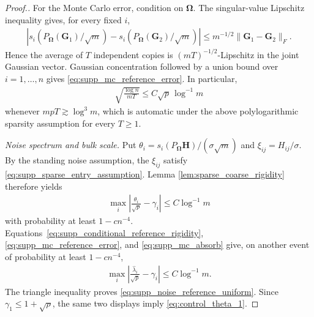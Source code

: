 \documentclass[numsec,webpdf,modern,large,namedate]{oup-authoring-template}
\theoremstyle{plain}
\theoremstyle{remark}
\newcommand{\bH}{\bm{H}}
\newcommand{\bOmega}{\bm{\Omega}}
\newif\ifmarkchanges
\newenvironment{revision}{\begingroup\ifmarkchanges\color{red}\fi}{\endgroup}
\begin{document}
\begin{revision}
\begin{proof}[Proof.]
For the Monte Carlo error, condition on $\bOmega$.  The singular-value
Lipschitz inequality gives, for every fixed $i$,
\begin{align*}
    |s_i(P_{\bOmega}(\bm G_1)/\sqrt m)
      -s_i(P_{\bOmega}(\bm G_2)/\sqrt m)|
    \le m^{-1/2}\|\bm G_1-\bm G_2\|_F.
\end{align*}
Hence the average of $T$ independent copies is
$(mT)^{-1/2}$-Lipschitz in the joint Gaussian vector.  Gaussian
concentration followed by a union bound over $i=1,\ldots,n$ gives
\eqref{eq:supp_mc_reference_error}.  In particular,
\begin{align}
\label{eq:supp_mc_absorb}
    \sqrt{\frac{\log n}{mT}}
    \le C\sqrt p\,\log^{-1}m
\end{align}
whenever $mpT\gtrsim\log^3m$, which is automatic under the above
polylogarithmic sparsity assumption for every $T\ge1$.

\textit{Noise spectrum and bulk scale.} Put
$\theta_i=s_i(P_{\bOmega}\bH)/(\sigma\sqrt m)$ and $\xi_{ij}=H_{ij}/\sigma$.  By the standing noise assumption, the $\xi_{ij}$ satisfy
\eqref{eq:supp_sparse_entry_assumption}.  Lemma
\ref{lem:sparse_coarse_rigidity} therefore yields
\begin{align}
\label{eq:supp_noise_to_mp}
    \max_i\left|
    \frac{\theta_i}{\sqrt p}-\gamma_i
    \right|\le C\log^{-1}m
\end{align}
with probability at least $1-cn^{-4}$.  Equations~\eqref{eq:supp_conditional_reference_rigidity},
\eqref{eq:supp_mc_reference_error}, and \eqref{eq:supp_mc_absorb} give, on another event of probability at least
$1-cn^{-4}$,
\begin{align}
\label{eq:supp_reference_to_mp}
    \max_i\left|
    \frac{\widehat\lambda_i}{\sqrt p}-\gamma_i
    \right|\le C\log^{-1}m.
\end{align}
The triangle inequality proves
\eqref{eq:supp_noise_reference_uniform}.  Since
$\gamma_1\le1+\sqrt\rho$, the same two displays imply
\eqref{eq:control_theta_1}.


\end{proof}
\end{revision}
\end{document}

